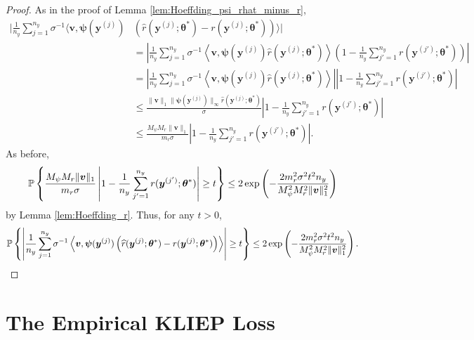 \documentclass[11pt]{article}
\numberwithin{equation}{section}
\numberwithin{theorem}{section}
\def\fatv{\boldsymbol{v}}
\def\faty{\boldsymbol{y}}
\def\fattheta{\boldsymbol{\theta}}
\def\fatpsi{\boldsymbol{\psi}}
\theoremstyle{definition}
\theoremstyle{remark}
\begin{document}
\begin{proof}
As in the proof of Lemma \ref{lem:Hoeffding_psi_rhat_minus_r},
\begin{equation}
\begin{aligned}
\Big| \frac{1}{n_y} \sum_{j=1}^{n_y} \sigma^{-1} \big\langle \fatv, \fatpsi(\faty^{(j)}) & \left( \hat r(\faty^{(j)};\fattheta^*) - r(\faty^{(j)};\fattheta^*) \right) \big\rangle \Big| \\
&= \left| \frac{1}{n_y} \sum_{j=1}^{n_y} \sigma^{-1} \left\langle \fatv, \fatpsi(\faty^{(j)}) \hat r(\faty^{(j)};\fattheta^*) \right\rangle \left( 1 - \frac{1}{n_y} \sum_{j'=1}^{n_y} r(\faty^{(j')};\fattheta^*) \right) \right| \\
&= \left| \frac{1}{n_y} \sum_{j=1}^{n_y} \sigma^{-1} \left\langle \fatv, \fatpsi(\faty^{(j)}) \hat r(\faty^{(j)};\fattheta^*) \right\rangle \right| \left| 1 - \frac{1}{n_y} \sum_{j'=1}^{n_y} r(\faty^{(j')};\fattheta^*) \right| \\
&\leq \frac{\|\fatv\|_1 \|\fatpsi(\faty^{(j)})\|_\infty \hat r(\faty^{(j)};\fattheta^*)}{\sigma} \left| 1 - \frac{1}{n_y} \sum_{j'=1}^{n_y} r(\faty^{(j')};\fattheta^*) \right| \\
&\leq \frac{M_\psi M_r \|\fatv\|_1}{m_r \sigma} \left| 1 - \frac{1}{n_y} \sum_{j'=1}^{n_y} r(\faty^{(j')};\fattheta^*) \right|.
\end{aligned}
\end{equation}
As before,
\begin{equation}
\PP\left\{ \frac{M_\psi M_r \|\fatv\|_1}{m_r \sigma} \left| 1 - \frac{1}{n_y} \sum_{j'=1}^{n_y} r(\faty^{(j')};\fattheta^*) \right| \geq t \right\}
\leq 2\exp\left( -\frac{2 m_r^2 \sigma^2 t^2 n_y}{M_\psi^2 M_r^2 \|\fatv\|_1^2} \right)
\end{equation}
by Lemma \ref{lem:Hoeffding_r}.
Thus, for any $t > 0$,
\begin{equation}
\PP\left\{ \left| \frac{1}{n_y} \sum_{j=1}^{n_y} \sigma^{-1} \left\langle \fatv, \fatpsi(\faty^{(j)}) \left( \hat r(\faty^{(j)};\fattheta^*) - r(\faty^{(j)};\fattheta^*) \right) \right\rangle \right| \geq t \right\}
\leq 2\exp\left( -\frac{2 m_r^2 \sigma^2 t^2 n_y}{M_\psi^2 M_r^2 \|\fatv\|_1^2} \right).
\end{equation}
\end{proof}

\section{The Empirical KLIEP Loss}
\end{document}
